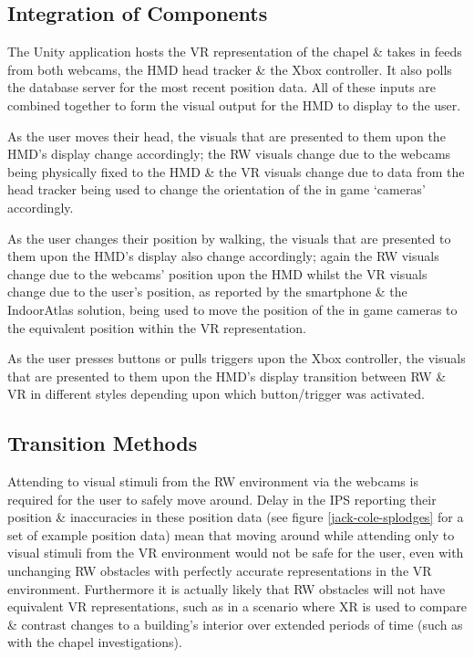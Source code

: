 
\subsection{Integration of Components}
The Unity application hosts the VR representation of the chapel \& takes in feeds from both webcams, the HMD head tracker \& the Xbox controller. It also polls the database server for the most recent position data. All of these inputs are combined together to form the visual output for the HMD to display to the user.

As the user moves their head, the visuals that are presented to them upon the HMD's display change accordingly; the RW visuals change due to the webcams being physically fixed to the HMD \& the VR visuals change due to data from the head tracker being used to change the orientation of the in game `cameras' accordingly.

As the user changes their position by walking, the visuals that are presented to them upon the HMD's display also change accordingly; again the RW visuals change due to the webcams' position upon the HMD whilst the VR visuals change due to the user's position, as reported by the smartphone \& the IndoorAtlas solution, being used to move the position of the in game cameras to the equivalent position within the VR representation.

As the user presses buttons or pulls triggers upon the Xbox controller, the visuals that are presented to them upon the HMD's display transition between RW \& VR in different styles depending upon which button/trigger was activated.


\subsection{Transition Methods}
Attending to visual stimuli from the RW environment via the webcams is required for the user to safely move around. Delay in the IPS reporting their position \& inaccuracies in these position data (see figure \ref{jack-cole-splodges} for a set of example position data) mean that moving around while attending only to visual stimuli from the VR environment would not be safe for the user, even with unchanging RW obstacles with perfectly accurate representations in the VR environment. Furthermore it is actually likely that RW obstacles will not have equivalent VR representations, such as in a scenario where XR is used to compare \& contrast changes to a building's interior over extended periods of time (such as with the chapel investigations).

